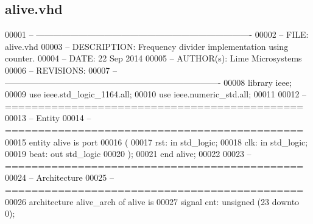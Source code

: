 \subsection{alive.\+vhd}
\label{alive_8vhd_source}

\begin{DoxyCode}
00001 \textcolor{keyword}{-- ---------------------------------------------------------------------------- }
00002 \textcolor{keyword}{-- FILE:    alive.vhd}
00003 \textcolor{keyword}{-- DESCRIPTION: Frequency divider implementation using counter.}
00004 \textcolor{keyword}{-- DATE:    22 Sep 2014}
00005 \textcolor{keyword}{-- AUTHOR(s):   Lime Microsystems}
00006 \textcolor{keyword}{-- REVISIONS:   }
00007 \textcolor{keyword}{-- ---------------------------------------------------------------------------- }
00008 \textcolor{vhdlkeyword}{library }\textcolor{keywordflow}{ieee};
00009 \textcolor{vhdlkeyword}{use }ieee.std\_logic\_1164.\textcolor{keywordflow}{all};
00010 \textcolor{vhdlkeyword}{use }ieee.numeric\_std.\textcolor{keywordflow}{all};
00011 
00012 \textcolor{keyword}{--=============================================}
00013 \textcolor{keyword}{-- Entity}
00014 \textcolor{keyword}{--=============================================}
00015 \textcolor{keywordflow}{entity }alive \textcolor{keywordflow}{is} \textcolor{keywordflow}{port}
00016     \textcolor{vhdlchar}{(}
00017          \textcolor{vhdlchar}{rst}\textcolor{vhdlchar}{:} \textcolor{keywordflow}{in} \textcolor{comment}{std\_logic};
00018          \textcolor{vhdlchar}{clk}\textcolor{vhdlchar}{:} \textcolor{keywordflow}{in} \textcolor{comment}{std\_logic};
00019          \textcolor{vhdlchar}{beat}\textcolor{vhdlchar}{:} \textcolor{keywordflow}{out} \textcolor{comment}{std\_logic}
00020     \textcolor{vhdlchar}{)};
00021 \textcolor{keywordflow}{end} \textcolor{vhdlchar}{alive};
00022 
00023 \textcolor{keyword}{--=============================================}
00024 \textcolor{keyword}{-- Architecture}
00025 \textcolor{keyword}{--=============================================}
00026 \textcolor{keywordflow}{architecture} alive\_arch \textcolor{keywordflow}{of} alive is
00027     \textcolor{keywordflow}{signal} \textcolor{vhdlchar}{cnt}\textcolor{vhdlchar}{:} \textcolor{comment}{unsigned} \textcolor{vhdlchar}{(}\textcolor{vhdllogic}{}\textcolor{vhdllogic}{23} \textcolor{keywordflow}{downto} \textcolor{vhdllogic}{}\textcolor{vhdllogic}{0}\textcolor{vhdlchar}{)};

\end{DoxyCode}
